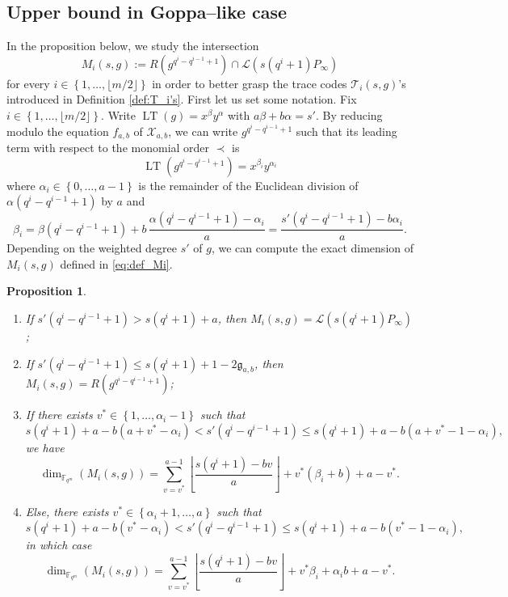 \documentclass[a4paper]{amsart}
\newtheorem{proposition}[thm]{Proposition}
\theoremstyle{definition}
\theoremstyle{remark}
\newcommand{\calL}{\mathcal{L}}
\newcommand{\calT}{\mathcal{T}}
\newcommand{\calX}{\mathcal{X}}
\newcommand{\fqm}{\mathbb{F}_{q^m}}
\newcommand{\set}[1]{\left\{#1\right\}}
\newcommand{\LT}[1]{\operatorname{LT}\left(#1\right)}
\begin{document}
\subsection{Upper bound in Goppa--like case}
In the proposition below, we study the intersection 
\begin{equation}\label{eq:def_Mi}
M_i(s,g):=R\left(g^{q^{i}-q^{i-1}+1}\right) \cap \calL(s(q^i+1)P_\infty)
\end{equation}
for every $i \in \set{1,\dots,\lfloor m/2 \rfloor}$ in order to better grasp the trace codes $\calT_i(s,g)$'s introduced in Definition \ref{def:T_i's}.
First let us set some notation. Fix $i \in \set{1,\dots,\lfloor m/2 \rfloor}$. Write $\LT{g}=x^\beta y^\alpha$ with $a\beta + b\alpha=s'$. By reducing modulo the equation $f_{a,b}$ of $\calX_{a,b}$, we can write $g^{q^i-q^{i-1}+1}$ such that its leading term with respect to the monomial order $\prec$ is
\begin{equation}\label{eq:gi}
 \LT{g^{q^i-q^{i-1}+1}}=x^{\beta_i} y^{\alpha_i}
\end{equation}
 where $\alpha_i \in \set{0,\dots,a-1}$ is the remainder of the Euclidean division of $\alpha (q^i-q^{i-1}+1)$ by $a$ and 
 \begin{equation}\label{eq:value_beta_prime}
  \beta_i=\beta(q^i-q^{i-1}+1) + b \, \frac{\alpha(q^i-q^{i-1}+1)-\alpha_i}{a}= \frac{s'(q^i-q^{i-1}+1)-b\alpha_i}{a}.
 \end{equation}
%
Depending on the weighted degree $s'$ of $g$, we can compute the exact dimension of $M_i(s,g)$ defined in \eqref{eq:def_Mi}.
\begin{proposition} \label{prop:dim_M_i's}
    \begin{enumerate}
        \item If $s'(q^i-q^{i-1}+1) > s(q^i+1)+a$, then $M_i(s,g) = \calL(s(q^i+1)P_\infty)$ ;
        
        \item If $s'(q^i-q^{i-1}+1) \leq s(q^i+1)+1-2\mathfrak{g}_{a,b}$, then $M_i(s,g) = R(g^{q^{i}-q^{i-1}+1})$;
        
        \item If there exists $v^* \in \set{1,\dots,\alpha_i-1}$ such that
        $$ s(q^i+1)+a-b(a+v^*-\alpha_i) < s'(q^i-q^{i-1}+1) \leq  s(q^i+1)+a-b(a+v^*-1-\alpha_i),$$
        we have 
          $$\dim_{\fqm}(M_i(s,g)) = \sum\limits_{v=v^*}^{a-1} \left\lfloor \dfrac{s(q^i+1)-bv}{a} \right\rfloor + v^*(\beta_i+b) + a-v^*.$$
        
        \item Else, there exists $v^* \in \set{\alpha_i+1,\dots,a}$ such that
        $$ s(q^i+1)+a-b(v^*-\alpha_i) < s'(q^i-q^{i-1}+1) \leq  s(q^i+1)+a-b(v^*-1-\alpha_i),$$
        in which case 
        $$\dim_{\fqm}(M_i(s,g)) = \sum\limits_{v=v^*}^{a-1} \left\lfloor \dfrac{s(q^i+1)-bv}{a} \right\rfloor + v^*\beta_i + \alpha_ib +a-v^*.$$
    \end{enumerate}
\end{proposition}
\end{document}
